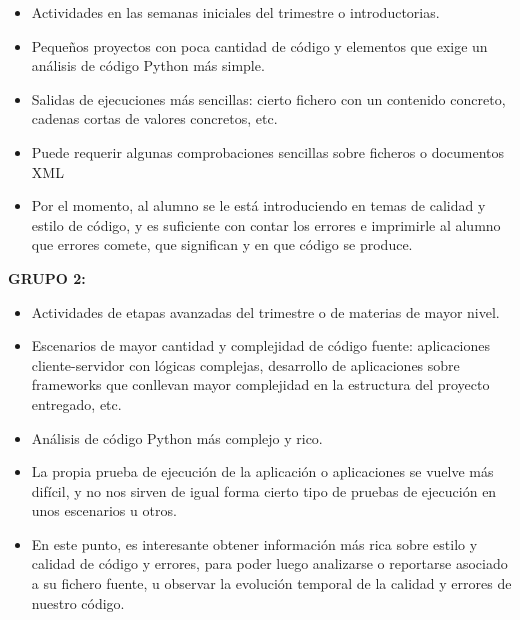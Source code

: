 \begin{itemize}
\item Actividades en las semanas iniciales del trimestre o introductorias.\\

\item Pequeños proyectos con poca cantidad de código y elementos que exige un análisis de código Python más simple.\\

\item Salidas de ejecuciones más sencillas: cierto fichero con un contenido concreto, cadenas cortas de valores concretos, etc.\\

\item Puede requerir algunas comprobaciones sencillas sobre ficheros o documentos XML\\

\item Por el momento, al alumno se le está introduciendo en temas de calidad y estilo de código, y es suficiente con contar los errores e imprimirle al alumno que errores comete, que significan y en que código se produce.\\
\end{itemize}


\textbf{GRUPO 2:}


\begin{itemize}
\item Actividades de etapas avanzadas del trimestre o de materias de mayor nivel.\\

\item Escenarios de mayor cantidad y complejidad de código fuente: aplicaciones cliente-servidor con lógicas complejas, desarrollo de aplicaciones sobre frameworks que conllevan mayor complejidad en la estructura del proyecto entregado, etc.\\

\item Análisis de código Python más complejo y rico.\\

\item La propia prueba de ejecución de la aplicación o aplicaciones se vuelve más difícil, y no nos sirven de igual forma cierto tipo de pruebas de ejecución en unos escenarios u otros.\\

\item En este punto, es interesante obtener información más rica sobre estilo y calidad de código y errores, para poder luego analizarse o reportarse asociado a su fichero fuente, u observar la evolución temporal de la calidad y errores de nuestro código.
\end{itemize}


